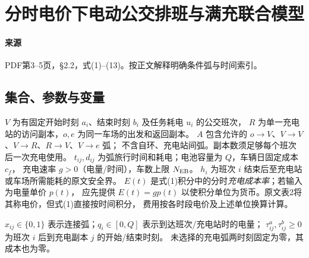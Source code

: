 \documentclass[UTF8,11pt]{ctexart}
\begin{document}
\section*{分时电价下电动公交排班与满充联合模型}

\paragraph{来源} PDF第3--5页，§2.2，式(1)--(13)。按正文解释明确条件弧与时间索引。
\subsection*{集合、参数与变量}
$V$ 为有固定开始时刻 $a_i$、结束时刻 $b_i$ 及任务耗电 $u_i$ 的公交班次，
$R$ 为单一充电站的访问副本，$o,e$ 为同一车场的出发和返回副本。
$A$ 包含允许的 $o\to V$、$V\to V$、$V\to R$、$R\to V$、$V\to e$ 弧；
不含自环、充电站间弧。副本数须足够每个班次后一次充电使用。
$t_{ij},d_{ij}$ 为弧旅行时间和耗电；电池容量为 $Q$，车辆日固定成本 $c_f$，
充电速率 $g>0$（电量/时间），车数上限 $N_{\rm EB}$。
$h_i$ 为班次 $i$ 结束后至充电站或车场所需能耗的原文安全界。
$E(t)$ 是式(1)积分中的分时\emph{充电成本率}；若输入为电量单价 $p(t)$，
应先提供 $E(t)=g p(t)$ 以使积分单位为货币。原文表2将其称电价，但式(1)直接按时间积分，
费用按各时段电价及上述单位换算计算。

$x_{ij}\in\{0,1\}$ 表示连接弧；$q_i\in[0,Q]$ 表示到达班次/充电站时的电量；
$\tau^a_{ij},\tau^b_{ij}\ge0$ 为班次 $i$ 后到充电副本 $j$ 的开始/结束时刻。
未选择的充电弧两时刻固定为零，其成本也为零。
\end{document}
